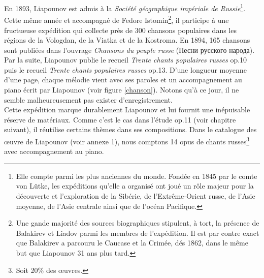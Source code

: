 En 1893, Liapounov est admis à la \emph{Société géographique impériale de Russie}\footnote{Elle compte parmi les plus anciennes du monde. Fondée en 1845 par le comte von Lütke, les expéditions qu'elle a organisé ont joué un rôle majeur pour la découverte et l'exploration de la Sibérie, de l'Extrême-Orient russe, de l'Asie moyenne, de l'Asie centrale ainsi que de l'océan Pacifique.}. Cette même année et accompagné de Fedore Istomin\footnote{Une gande majorité des sources biographiques stipulent, à tort, la présence de Balakirev et Liadov parmi les membres de l'expédition. Il est par contre exact que Balakirev a parcouru le Caucase et la Crimée, dés 1862, dans le même but que Liapounov 31 ans plus tard.}, il participe à une fructueuse expédition qui collecte près de 300 chansons populaires dans les régions de la Vologdan, de la Viatka et de la Kostroma. En 1894, 165 chansons sont publiées dans l'ouvrage \emph{Chansons du peuple russe} (\foreignlanguage{russian}{Песни русского народа}). Par la suite, Liapounov publie le recueil \emph{Trente chants populaires russes} op.10 puis le recueil \emph{Trente chants populaires russes} op.13. D'une longueur moyenne d'une page, chaque mélodie vient avec ses paroles et un accompagnement au piano écrit par Liapounov (voir figure \ref{chanson}). Notons qu'à ce jour, il ne semble malheureusement pas exister d'enregistrement.\\

Cette expédition marque durablement Liapounov et lui fournit une inépuisable réserve de matériaux. Comme c'est le cas dans l'étude op.11  (voir chapitre suivant), il réutilise certains thèmes dans ses compositions. Dans le catalogue des œuvre de Liapounov (voir annexe 1), nous comptons 14 opus de chants russes\footnote{Soit 20\% des œuvres.} avec accompagnement au piano.

